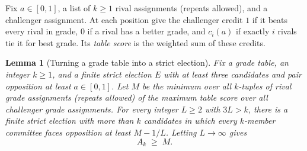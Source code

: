 \documentclass[11pt,letterpaper]{article}
\theoremstyle{cleanthm}
\newtheorem{lemma}{Lemma}
\begin{document}
Fix \(a\in[0,1]\), a list of \(k\ge1\) rival assignments (repeats allowed), and a challenger
assignment. At each position give the challenger credit \(1\) if it beats every rival in grade,
\(0\) if a rival has a better grade, and \(c_i(a)\) if exactly \(i\) rivals tie it for best grade.
Its \emph{table score} is the weighted sum of these credits.

\begin{lemma}[Turning a grade table into a strict election]\label{lem:refine}
Fix a grade table, an integer \(k\ge 1\), and a finite strict election \(E\) with at least three
candidates and pair opposition at least \(a\in[0,1]\). Let \(M\) be the minimum over all
\(k\)-tuples of rival grade assignments (repeats allowed) of the maximum table score over all
challenger grade assignments. For every integer \(L\ge 2\) with \(3L>k\), there is a finite strict
election with more than \(k\) candidates in which every \(k\)-member committee faces opposition at
least \(M-1/L\). Letting \(L\to\infty\) gives
\begin{equation}\label{eq:refine-limit}
 A_k \;\ge\; M.
\end{equation}
\end{lemma}
\end{document}
